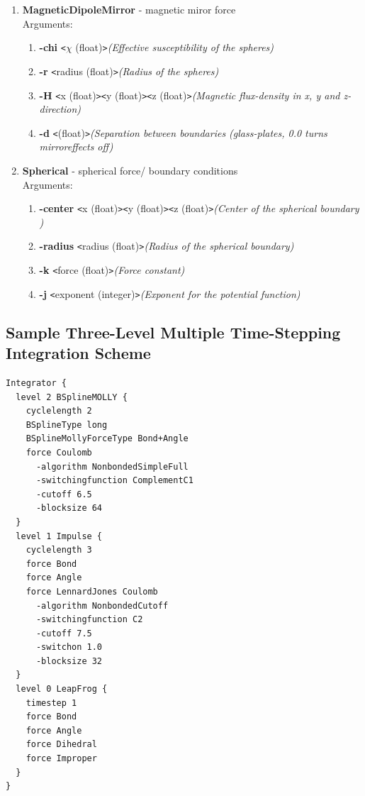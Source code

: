 \documentclass[11pt]{report}
\newcommand{\tempstart}{\texttt{<}}
\newcommand{\tempend}{\texttt{>}}
\begin{document}
\begin{enumerate}
\begin{enumerate}
\begin{enumerate}
    \end{enumerate}
  \item {\bf MagneticDipoleMirror} - magnetic miror force\\
    Arguments:
    \begin{enumerate}
    \item {\bf -chi} \tempstart $\chi$ (float)\tempend {\it (Effective susceptibility of the spheres)}
    \item {\bf -r} \tempstart radius (float)\tempend {\it (Radius of the spheres)}
    \item {\bf -H} \tempstart x (float)\tempend \tempstart y (float)\tempend \tempstart z (float)\tempend {\it (Magnetic flux-density in x, y and z-direction)}
    \item {\bf -d} \tempstart  (float)\tempend {\it (Separation
between boundaries (glass-plates, 0.0 turns mirroreffects off)}
    \end{enumerate}
  \item {\bf Spherical} - spherical force/ boundary conditions\\
    Arguments:
    \begin{enumerate}
    \item {\bf -center}  \tempstart x (float)\tempend \tempstart y
    (float)\tempend \tempstart z (float)\tempend {\it (Center of the spherical boundary )}
    \item {\bf -radius} \tempstart radius (float)\tempend {\it (Radius of the spherical boundary)}
    \item {\bf -k}  \tempstart force (float)\tempend {\it (Force constant)}
    \item {\bf -j}  \tempstart exponent (integer)\tempend  {\it (Exponent for the potential function)}
  \end{enumerate}
\end{enumerate}
\end{enumerate}

\newpage
\subsection{Sample Three-Level Multiple Time-Stepping Integration Scheme}
\begin{verbatim}
Integrator {
  level 2 BSplineMOLLY {
    cyclelength 2
    BSplineType long
    BSplineMollyForceType Bond+Angle
    force Coulomb
      -algorithm NonbondedSimpleFull
      -switchingfunction ComplementC1
      -cutoff 6.5
      -blocksize 64
  }
  level 1 Impulse { 
    cyclelength 3
    force Bond
    force Angle
    force LennardJones Coulomb
      -algorithm NonbondedCutoff
      -switchingfunction C2
      -cutoff 7.5
      -switchon 1.0
      -blocksize 32
  }
  level 0 LeapFrog {
    timestep 1
    force Bond
    force Angle
    force Dihedral
    force Improper
  }
}
\end{verbatim}
\end{document}
